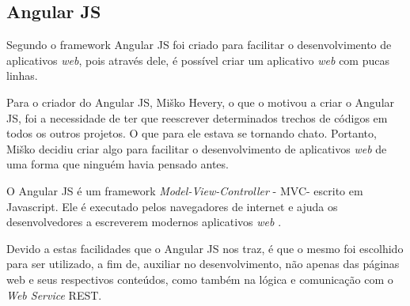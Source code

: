 \subsection{Angular JS}

Segundo  o framework Angular JS foi criado para facilitar o desenvolvimento de aplicativos \textit{web}, pois através dele, é possível criar um aplicativo \textit{web} com pucas linhas.

Para o criador do Angular JS, Miško Hevery, o que o motivou a criar o Angular JS, foi a necessidade de ter que reescrever determinados trechos de códigos em todos os outros projetos. O que para ele estava se tornando chato. Portanto, Miško decidiu criar algo para facilitar o desenvolvimento de aplicativos \textit{web} de uma forma que ninguém havia pensado antes.

O Angular JS é um framework \textit{Model-View-Controller} - MVC\footnotemark[27] - escrito em Javascript. Ele é executado pelos navegadores de internet e ajuda os desenvolvedores a escreverem modernos aplicativos \textit{web} \cite{kozlowski_darwin_mastering_web_application_angular_js}.


Devido a estas facilidades que o Angular JS nos traz, é que o mesmo foi escolhido para ser utilizado, a fim de, auxiliar no desenvolvimento, não apenas das páginas web e seus respectivos conteúdos, como também na lógica e comunicação com o \textit{Web Service} REST.
